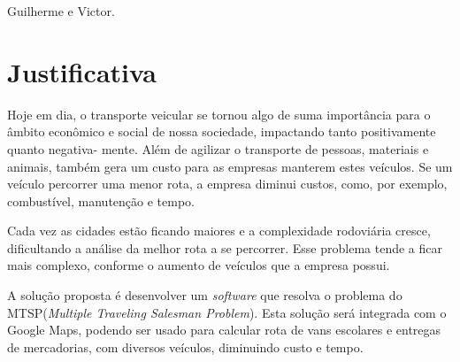 \documentclass{abnt}
\begin{document}

	
	
	
	

	Guilherme e Victor.

	\section{Justificativa}



	Hoje em dia, o transporte veicular se tornou algo de suma importância para o âmbito
	econômico e social de nossa sociedade, impactando tanto positivamente quanto negativa-
	mente. 
	Além de agilizar o transporte de pessoas, materiais e animais, também gera um
	custo para as empresas manterem estes veículos. Se um veículo percorrer uma menor rota,
	a empresa diminui custos, como, por exemplo, combustível, manutenção e tempo. 

	Cada vez as cidades estão ficando maiores e a complexidade rodoviária cresce, dificultando a
	análise da melhor rota a se percorrer. Esse problema tende a ficar mais complexo, conforme o aumento de
	veículos que a empresa possui.
	
	A solução proposta é desenvolver um \textit{software} que resolva o problema do MTSP(\textit{Multiple Traveling Salesman Problem}).
	Esta solução será integrada com o Google Maps, podendo ser usado para calcular rota de vans escolares e entregas de mercadorias, com diversos veículos,
	diminuindo custo e tempo.
\end{document}
